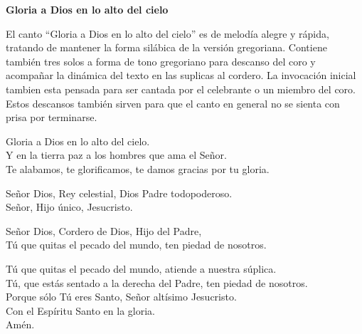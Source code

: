 \documentclass[12pt, letterpaper]{report}
\begin{document}



    \begin{center}
      \LARGE \textbf{Gloria a Dios en lo alto del cielo}
    \end{center}

    \Large El canto ``Gloria a Dios en lo alto del cielo'' es de melod\'ia alegre y r\'apida, tratando de mantener la forma sil\'abica de la versi\'on gregoriana. Contiene tambi\'en tres solos a forma de tono gregoriano para descanso del coro y acompa\~nar la din\'amica del texto en las suplicas al cordero. La invocaci\'on inicial tambien esta pensada para ser cantada por el celebrante o un miembro del coro.  Estos descansos tambi\'en sirven para que el canto en general no se sienta con prisa por terminarse.

    \noindent
    \LARGE Gloria a Dios en lo alto del cielo.\\
    Y en la tierra paz a los hombres que ama el Se\~nor. \\
    Te alabamos, te glorificamos, te damos gracias por tu gloria.

    \noindent
    Se\~nor Dios, Rey celestial, Dios Padre todopoderoso. \\
    Se\~nor, Hijo \'unico, Jesucristo.

    \noindent
    Se\~nor Dios, Cordero de Dios, Hijo del Padre, \\
    T\'u que quitas el pecado del mundo, ten piedad de nosotros.

    \noindent
    T\'u que quitas el pecado del mundo, atiende a nuestra s\'uplica. \\
    T\'u, que est\'as sentado a la derecha del Padre, ten piedad de nosotros.\\
    Porque s\'olo T\'u eres Santo, Se\~nor alt\'isimo Jesucristo. \\
    Con el Esp\'iritu Santo en la gloria.\\
    Am\'en.
    \clearpage
\end{document}
